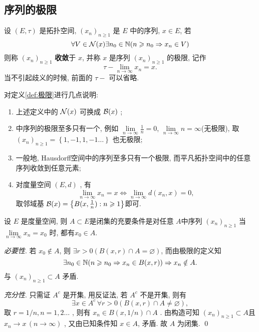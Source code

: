  \subsection{序列的极限}
 \begin{Def}[极限]\label{def:极限}
       设 $ (E, \tau) $ 是拓扑空间, $ (x_{n})_{n\geqslant 1} $ 是 $ E $ 中的序列,  $ x\in E $, 若
       \[
            \forall V\in\mathcal{N}(x)\exists n_{0}\in\mathbb{N}(n\geqslant n_{0}\Rightarrow x_{n}\in V)
       \]
       则称 $ (x_{n})_{n\geqslant1} $ \textbf{收敛}于 $ x $, 并称 $ x $ 是序列 $ (x_{n})_{n\geqslant1} $ 的极限, 记作
       \[
            \tau-\lim_{n\to \infty}x_{n}=x. 
       \] 
       当不引起歧义的时候, 前面的 $ \tau- $ 可以省略. 
 \end{Def}
\begin{Rmk}
     对定义\ref{def:极限}进行几点说明:
     \begin{enumerate}[(1)]
          \item 上述定义中的 $ \mathcal{N}(x) $ 可换成 $ \mathcal{B}(x) $ ;
          \item \R 中序列的极限至多只有一个, 例如 $\lim\limits_{n\to\infty}\frac{1}{n}=0 $, $ \lim\limits_{n\to\infty} n=\infty$(无极限), 取 $ (x_{n})_{n\geqslant1}=\left\{ 1, -1, 1,  -1\ldots \right\} $ 也无极限;
          \item 一般地, Hausdorff空间中的序列至多只有一个极限, 而平凡拓扑空间中的任意序列收敛到任意元素;
          \item 对度量空间 $ (E, d) $ , 有
          \[
               \lim_{n\to \infty}x_{n}=x \Leftrightarrow \lim_{n\to\infty}d(x_{n}, x)=0, 
          \]
          取邻域基 $ \mathcal{B}(x)=\left\{ B(x, \frac{1}{n}): n\geqslant1 \right\} $即可.  
     \end{enumerate}
\end{Rmk}
\begin{Prop}
     设 $ E $ 是度量空间, 则 $ A\subset E $是闭集的充要条件是对任意 $ A $中序列  $ (x_{n})_{n\geqslant1} $ 当 $ \lim\limits_{n\to\infty}x_{n}=x_{0} $ 时, 都有$ x_{0}\in A $.  
\end{Prop}
\begin{Prf}
     \textit{必要性}. 若 $ x_{0}\notin A $, 则 $ \exists r>0 (B(x, r)\cap A=\varnothing) $, 而由极限的定义知 
     \[
          \exists n_{0}\in\mathbb{N}(n\geqslant n_{0}\Rightarrow x_{n}\in B(x, r))\Rightarrow x_{n}\notin A. 
     \]
     与 $ (x_{n})_{n\geqslant1}\subset A $ 矛盾. 

     \textit{充分性}. 只需证 $ A^{c} $ 是开集, 用反证法, 若 $ A^{c} $ 不是开集, 则有
     \[
          \exists x\in A^{c}\,\forall r>0(B(x, r)\cap A\neq\varnothing),
     \]
     取 $ r=1/n, n=1, 2\ldots $ , 则有 $ x_{n}\in B(x, 1/n)\cap A $ . 由构造可知 $ (x_{n})_{n\geqslant1}\subset A $且 $ x_{n}\to x\,(n\to\infty) $  , 又由已知条件知 $ x\in A $, 矛盾. 故 $ A $ 为闭集. \qed 
\end{Prf}
